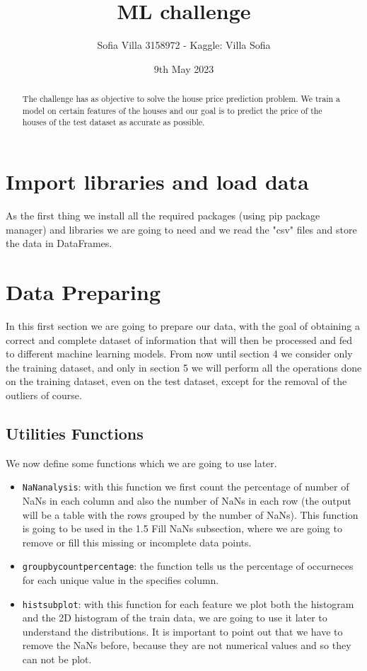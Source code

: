 \documentclass[10pt, notitlepage]{article}
\title{ML challenge}
\author{Sofia Villa 3158972 - Kaggle: Villa Sofia }
\date{9th May 2023}
\begin{document}
\maketitle 
\begin{abstract}
    The challenge has as objective to solve the house price prediction problem. We train a model on certain features of the houses and our goal is to predict the price of the houses of the test dataset as accurate as possible. 
\end{abstract}
\tableofcontents
\newpage


 
\color{blue}
\section{Import libraries and load data}
\color{black}

As the first thing we install all the required packages (using pip package manager) and libraries we are going to need and we read the "csv" files and store the data in DataFrames.

\color{blue}
\section{Data Preparing}
\color{black}
In this first section we are going to prepare our data, with the goal of obtaining a correct and complete dataset of information that will then be processed and fed to different machine learning models. From now until section 4 we consider only the training dataset, and only in section 5 we will perform all the operations done on the training dataset, even on the test dataset, except for the removal of the outliers of course.

\color{blue}
\subsection{Utilities Functions}
\color{black}
We now define some functions which we are going to use later.
\begin{itemize}
\item \texttt{NaN\textunderscore analysis}: with this function we first count the percentage of number of NaNs in each column and also the number of NaNs in each row (the output will be a table with the rows grouped by the number of NaNs). This function is going to be used in the 1.5 Fill NaNs subsection, where we are going to remove or fill this missing or incomplete data points. 
\item \texttt{groupby\textunderscore count\textunderscore percentage}: the function tells us the percentage of occurneces for each unique value in the specifies column. 
\item \texttt{hist\textunderscore subplot}: with this function for each feature we plot both the histogram and the 2D histogram of the train data, we are going to use it later to understand the distributions. It is important to point out that we have to remove the NaNs before, because they are not numerical values and so they can not be plot. 
\end{itemize}
\end{document}
